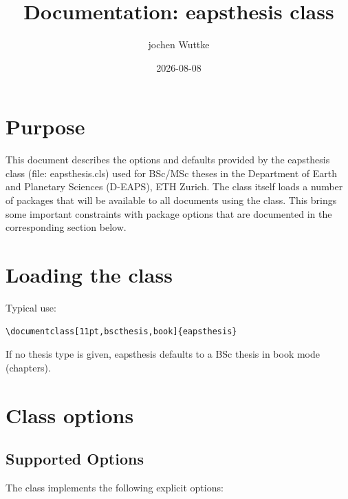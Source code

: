 \documentclass[11pt]{article}
\title{Documentation: eapsthesis class}
\author{jochen Wuttke}
\date{2026-08-08}
\begin{document}
\maketitle
\tableofcontents
\clearpage

\section{Purpose}
This document describes the options and defaults provided by the eapsthesis class (file: eapsthesis.cls) 
used for BSc/MSc theses in the Department of Earth and Planetary Sciences (D-EAPS), ETH Zurich.
The class itself loads a number of packages that will be available to all documents using the class.
This brings some important constraints with package options that are documented in the corresponding section below.

\section{Loading the class}
Typical use:
\begin{verbatim}
\documentclass[11pt,bscthesis,book]{eapsthesis}
\end{verbatim}

If no thesis type is given, eapsthesis defaults to a BSc thesis in book mode (chapters).

\section{Class options}

\subsection{Supported Options}

The class implements the following explicit options:
\end{document}
